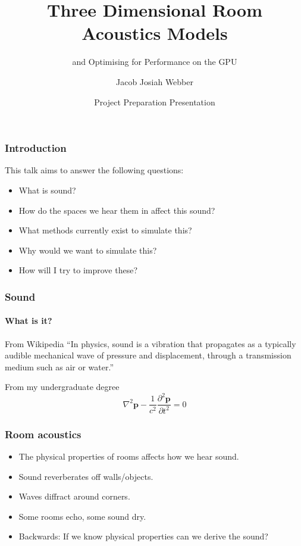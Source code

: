\documentclass{beamer}
\title[acoustics] %
{Three Dimensional Room Acoustics Models}
\subtitle{and Optimising for Performance on the GPU}
\author[Author] %
{Jacob Josiah Webber}
\date[4 April 2017] %
{Project Preparation Presentation}
\begin{document}
\frame{\titlepage}

  \begin{frame}
     \frametitle{Introduction}
     This talk aims to answer the following questions:
     \begin{itemize}
     \item What is sound?
     \item How do the spaces we hear them in affect this sound?
     \item What methods currently exist to simulate this?
     \item Why would we want to simulate this?
     \item How will I try to improve these?
     \end{itemize}
  \end{frame}



  \begin{frame}
    \frametitle{Sound}
    \framesubtitle{What is it?}
    \begin{block}{From Wikipedia}
    ``In physics, sound is a vibration that propagates as a typically audible mechanical wave of pressure and displacement, through a transmission medium such as air or water.''
    \end{block}
    \nocite{feynman}
    \begin{block}{From my undergraduate degree}
    \begin{equation}
    \nabla^{2} \textbf{p} - \frac{1}{{c^2 }}\frac{{\partial ^2 \textbf{p}}}{{\partial t^2 }} = 0
    \end{equation}
    \end{block}
  \end{frame}
  
  
  \begin{frame}
  \frametitle{Room acoustics}
  \begin{itemize}
  \item The physical properties of rooms affects how we hear sound.
  \item Sound reverberates off walls/objects.
  \item Waves diffract around corners.
  \item Some rooms echo, some sound dry.
  \item Backwards: If we know physical properties can we derive the sound?
  \end{itemize}
  \end{frame}
  
\end{document}
